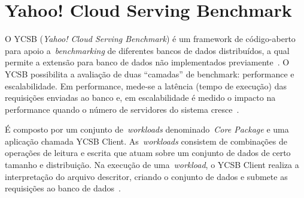 \documentclass[12pt]{article}
\begin{document}



\section{Yahoo! Cloud Serving Benchmark}

O YCSB (\emph{Yahoo! Cloud Serving Benchmark}) é um framework de código-aberto para apoio a~\emph{benchmarking} de diferentes bancos de dados distribuídos, a qual permite a extensão para banco de dados não implementados previamente~\cite{cooper2010benchmarking}. 
O YCSB possibilita a avaliação de duas ``camadas'' de benchmark: performance e escalabilidade. 
Em performance, mede-se a latência (tempo de execução) das requisições enviadas ao banco e, em escalabilidade é medido o impacto na performance quando o número de servidores do sistema cresce~\cite{cooper2010benchmarking}.

É composto por um conjunto de~\emph{workloads} denominado~\emph{Core Package} e uma aplicação chamada YCSB Client. 
As~\emph{workloads} consistem de combinações de operações de leitura e escrita que atuam sobre um conjunto de dados de certo tamanho e distribuição.
Na execução de uma~\emph{workload}, o YCSB Client realiza a interpretação do arquivo descritor, criando o conjunto de dados e submete as requisições ao banco de dados~\cite{cooper2010benchmarking}. 
\end{document}
